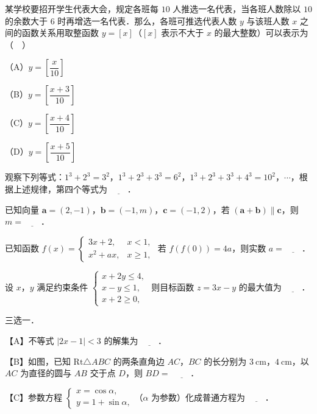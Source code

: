 \begin{question}
某学校要招开学生代表大会，规定各班每 $10$ 人推选一名代表，当各班人数除以 $10$ 的余数大于 $6$ 时再增选一名代表．那么，各班可推选代表人数 $y$ 与该班人数 $x$ 之间的函数关系用取整函数 $y=[x]$（$[x]$ 表示不大于 $x$ 的最大整数）可以表示为（　）

（A）$y=\left[\dfrac{x}{10}\right]$

（B）$y=\left[\dfrac{x+3}{10}\right]$

（C）$y=\left[\dfrac{x+4}{10}\right]$

（D）$y=\left[\dfrac{x+5}{10}\right]$

\end{question}
\begin{question}
观察下列等式：$1^3+2^3=3^2$，$1^3+2^3+3^3=6^2$，$1^3+2^3+3^3+4^3=10^2$，$\cdots$，根据上述规律，第四个等式为 $\underline{\qquad}$．

\end{question}
\begin{question}
已知向量 $\boldsymbol a=(2,-1)$，$\boldsymbol b=(-1,m)$，$\boldsymbol c=(-1,2)$，若 $(\boldsymbol a+\boldsymbol b)\parallel\boldsymbol c$，则 $m=\underline{\qquad}$．

\end{question}
\begin{question}
已知函数 $f(x)=\begin{cases}3x+2,&x<1,\\[2pt]x^2+ax,&x\geqslant 1,\end{cases}$ 若 $f(f(0))=4a$，则实数 $a=\underline{\qquad}$．

\end{question}
\begin{question}
设 $x$，$y$ 满足约束条件 $\begin{cases}x+2y\leqslant 4,\\[2pt]x-y\leqslant 1,\\[2pt]x+2\geqslant 0,\end{cases}$ 则目标函数 $z=3x-y$ 的最大值为 $\underline{\qquad}$．

\Needspace{0.4\textheight}
\end{question}
\begingroup
\renewenvironment{question}{\Needspace{0.35\textheight}}{}
\begin{question}
三选一．

【A】不等式 $|2x-1|<3$ 的解集为 $\underline{\qquad}$．

【B】如图，已知 $\mathrm{Rt}\triangle ABC$ 的两条直角边 $AC$，$BC$ 的长分别为 $3\ \mathrm{cm}$，$4\ \mathrm{cm}$，以 $AC$ 为直径的圆与 $AB$ 交于点 $D$，则 $BD=$ $\underline{\qquad}$．
\nopagebreak[4]
\begin{center}\end{center}
\nopagebreak[4]
【C】参数方程 $\begin{cases}x=\cos\alpha,\\[2pt]y=1+\sin\alpha,\end{cases}$（$\alpha$ 为参数）化成普通方程为 $\underline{\qquad}$．

\end{question}
